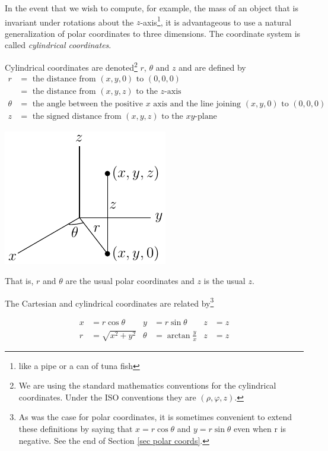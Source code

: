 In the event that we wish to compute, for example, the mass
of an object that is invariant under rotations about the 
$z$-axis\footnote{like a pipe or a can of tuna fish},
it is advantageous to use a natural generalization of polar coordinates
to three dimensions. The coordinate system is called \emph{cylindrical
coordinates}. 
\begin{defn}\label{def cylindrical}
Cylindrical coordinates are denoted\footnote{We are using the 
standard mathematics conventions for the cylindrical coordinates.
Under the ISO conventions they are $(\rho,\varphi,z)$.} 
$r$, $\theta$ and $z$ and are defined by
\begin{align*}
r&=\text{ the distance from }(x,y,0)\text{ to }(0,0,0)\\
 &=\text{ the distance from }(x,y,z)\text{ to the $z$-axis}\\
\theta&=\text{ the angle between the positive $x$ axis and the 
            line joining $(x,y,0)$ to $(0,0,0)$}\\
z&=\text{ the signed distance from }(x,y,z)
\text{ to the $xy$-plane}
\end{align*}
\begin{efig}
\begin{center}
    \includegraphics{../figs_coord/cyl1.pdf}
\end{center}
\end{efig}
That is, $r$ and $\theta$ are the usual polar coordinates and $z$ is the
usual $z$.
\end{defn}
 The Cartesian and cylindrical coordinates
are related by\footnote{As was the case for polar coordinates, it is 
sometimes convenient to extend these definitions by saying that 
$x = r\cos\theta$ and $y = r\sin\theta$ even when r is negative. See the end of Section \ref{sec polar coords}.}
\begin{impeqn}\label{eqn cylindrical}
\begin{align*}
x&=r\cos\theta &
y&=r\sin\theta &
z&=z \\
    r&=\sqrt{x^2+y^2} &
    \theta&=\arctan\frac{y}{x} &
    z&=z
\end{align*}
\end{impeqn}
